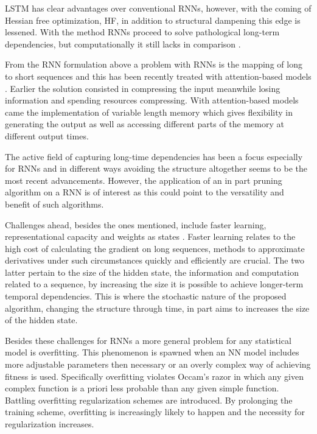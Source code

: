 LSTM has clear advantages over conventional RNNs, however, with the coming of Hessian free optimization, HF, in addition to structural dampening this edge is lessened. With the method RNNs proceed to solve pathological long-term dependencies, but computationally it still lacks in comparison \cite{suts}. 

From the RNN formulation above a problem with RNNs is the mapping of long to short sequences and this has been recently treated with attention-based models \cite{xu}. Earlier the solution consisted in compressing the input meanwhile losing information and spending resources compressing. With attention-based models came the implementation of variable length memory which gives flexibility in generating the output as well as accessing different parts of the memory at different output times. 

The active field of capturing long-time dependencies has been a focus especially for RNNs and in different ways avoiding the structure altogether seems to be the most recent advancements. However, the application of an in part pruning algorithm on a RNN is of interest as this could point to the versatility and benefit of such algorithms.

Challenges ahead, besides the ones mentioned, include faster learning, representational capacity and weights as states \cite{suts}. Faster learning relates to the high cost of calculating the gradient on long sequences, methods to approximate derivatives under such circumstances quickly and efficiently are crucial. The two latter pertain to the size of the hidden state, the information and computation related to a sequence, by increasing the size it is possible to achieve longer-term temporal dependencies. This is where the stochastic nature of the proposed algorithm, changing the structure through time, in part aims to increases the size of the hidden state.

Besides these challenges for RNNs a more general problem for any statistical model is overfitting. This phenomenon is spawned when an NN model includes more adjustable parameters then necessary or an overly complex way of achieving fitness is used. Specifically overfitting violates Occam's razor in which any given complex function is a priori less probable than any given simple function. Battling overfitting regularization schemes are introduced. By prolonging the training scheme, overfitting is increasingly likely to happen and the necessity for regularization increases.


